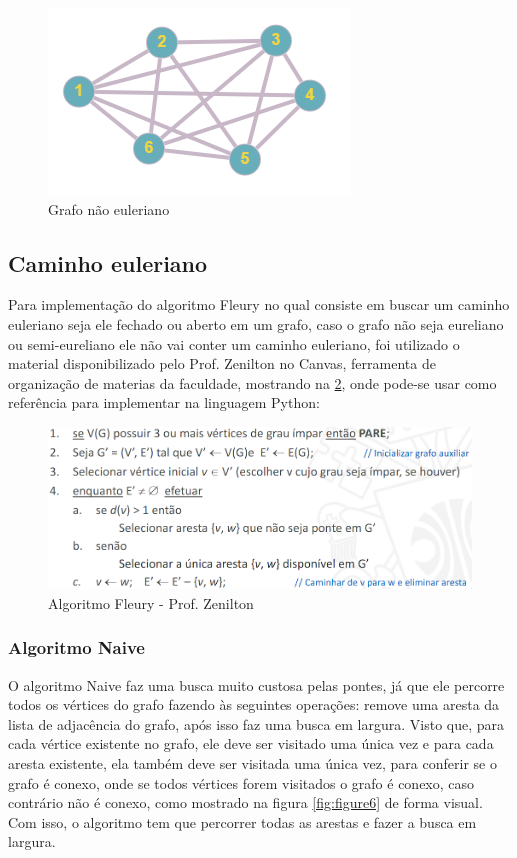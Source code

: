 \begin{figure}[ht]
    \centering
    \includegraphics[width=.2\textwidth]{figuras/not-eureliano.png}
    \caption{Grafo não euleriano}
    \label{fig:figure4}
\end{figure}

\subsection{\esp Caminho euleriano}
Para implementação do algoritmo Fleury no qual consiste em buscar um caminho euleriano seja ele fechado ou aberto em um grafo, caso o grafo não seja eureliano ou semi-eureliano ele não vai conter um caminho euleriano, foi utilizado o material disponibilizado pelo Prof. Zenilton no Canvas, ferramenta de organização de materias da faculdade, mostrando na \ref{fig:figure5}, onde pode-se usar como referência para implementar na linguagem Python:

\begin{figure}[ht]
    \centering
    \includegraphics[width=.9\textwidth]{figuras/fleury.png}
    \caption{Algoritmo Fleury - Prof. Zenilton}
    \label{fig:figure5}
\end{figure}

\subsubsection{\esp Algoritmo Naive}
O algoritmo Naive faz uma busca muito custosa pelas pontes, já que ele percorre todos os vértices do grafo fazendo às seguintes operações: remove uma aresta da lista de adjacência do grafo, após isso faz uma busca em largura. Visto que, para cada vértice existente no grafo, ele deve ser visitado uma única vez e para cada aresta existente, ela também deve ser visitada uma única vez, para conferir se o grafo é conexo, onde se todos vértices forem visitados o grafo é conexo, caso contrário não é conexo, como mostrado na figura \ref{fig:figure6} de forma visual. Com isso, o algoritmo tem que percorrer todas as arestas e fazer a busca em largura.

